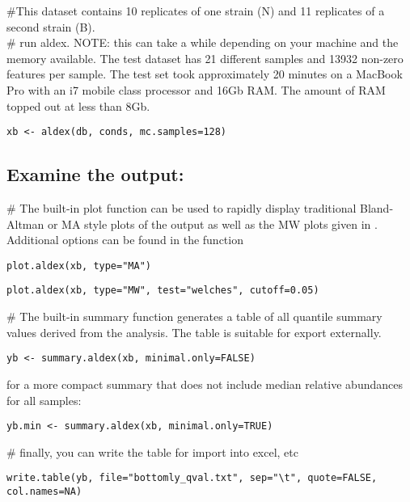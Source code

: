 \documentclass[11pt]{amsart}
\begin{document}
\noindent\#This dataset contains 10 replicates of one strain (N) and 11 replicates of a second strain (B).\\

\noindent \#  run aldex. NOTE: this can take a while depending on your machine and the memory available. The test dataset  has 21 different samples and  13932 non-zero features per sample. The test set took approximately 20 minutes on a MacBook Pro with an i7 mobile class processor and 16Gb RAM. The amount of RAM topped out at less than 8Gb.  \\

\begin{verbatim}xb <- aldex(db, conds, mc.samples=128)
\end{verbatim}

\subsection*{Examine the output:}
\noindent\#  The built-in plot function can be used to rapidly display traditional Bland-Altman or MA style plots of the output as well as the MW plots given in \cite{fernandes:2013}. Additional options can be found in the function\\
\noindent\begin{verbatim}plot.aldex(xb, type="MA")\end{verbatim}
\noindent\begin{verbatim}plot.aldex(xb, type="MW", test="welches", cutoff=0.05)
\end{verbatim}

\noindent\#  The built-in summary function generates a table of all quantile summary values derived from the analysis. The table is suitable for export externally. \\

\noindent\begin{verbatim}yb <- summary.aldex(xb, minimal.only=FALSE)\end{verbatim}
for a more compact summary that does not include median relative abundances for all samples:\\
\noindent\begin{verbatim}yb.min <- summary.aldex(xb, minimal.only=TRUE)\end{verbatim}

\noindent\# finally, you can write the table for import into excel, etc\\
\begin{verbatim}write.table(yb, file="bottomly_qval.txt", sep="\t", quote=FALSE, col.names=NA)\end{verbatim}
\end{document}
